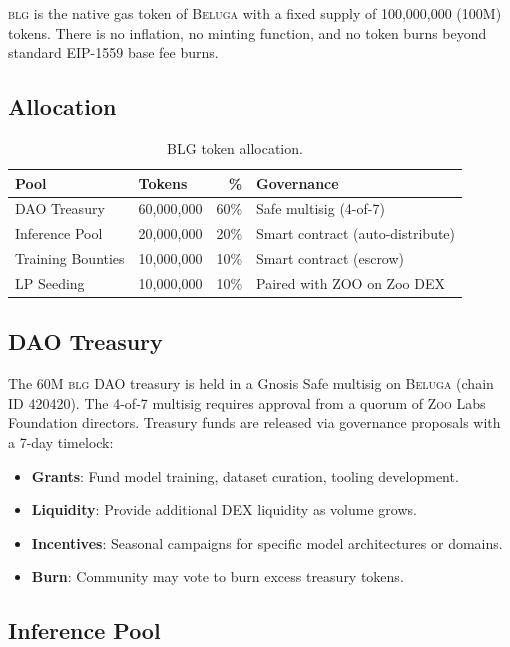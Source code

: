 \documentclass[11pt,letterpaper]{article}
\newcommand{\Zoo}{\textsc{Zoo}}
\newcommand{\Beluga}{\textsc{Beluga}}
\newcommand{\BLG}{\textsc{blg}}
\begin{document}
\BLG{} is the native gas token of \Beluga{} with a fixed supply of 100,000,000 (100M) tokens. There is no inflation, no minting function, and no token burns beyond standard EIP-1559 base fee burns.

\subsection{Allocation}

\begin{table}[h]
\centering
\caption{BLG token allocation.}
\label{tab:allocation}
\begin{tabular}{@{}llrl@{}}
\toprule
Pool & Tokens & \% & Governance \\
\midrule
DAO Treasury & 60,000,000 & 60\% & Safe multisig (4-of-7) \\
Inference Pool & 20,000,000 & 20\% & Smart contract (auto-distribute) \\
Training Bounties & 10,000,000 & 10\% & Smart contract (escrow) \\
LP Seeding & 10,000,000 & 10\% & Paired with ZOO on Zoo DEX \\
\bottomrule
\end{tabular}
\end{table}

\subsection{DAO Treasury}

The 60M \BLG{} DAO treasury is held in a Gnosis Safe multisig on \Beluga{} (chain ID 420420). The 4-of-7 multisig requires approval from a quorum of \Zoo{} Labs Foundation directors. Treasury funds are released via governance proposals with a 7-day timelock:

\begin{itemize}[nosep]
    \item \textbf{Grants}: Fund model training, dataset curation, tooling development.
    \item \textbf{Liquidity}: Provide additional DEX liquidity as volume grows.
    \item \textbf{Incentives}: Seasonal campaigns for specific model architectures or domains.
    \item \textbf{Burn}: Community may vote to burn excess treasury tokens.
\end{itemize}

\subsection{Inference Pool}
\end{document}
